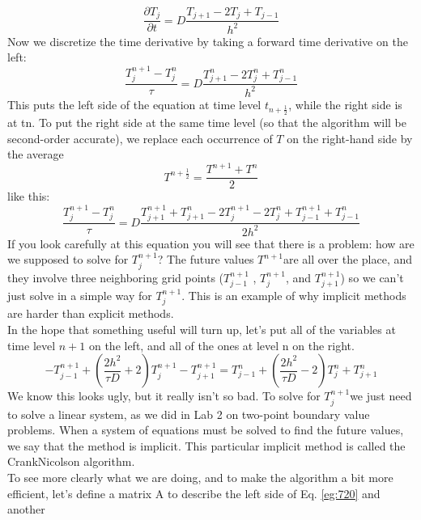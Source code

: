 \documentclass{book}
\theoremstyle{plain}
\theoremstyle{definition}
\numberwithin{exm}{chapter}
\theoremstyle{remark}
\theoremstyle{summary}
\theoremstyle{overview}
\begin{document}
\begin{equation}\label{eq:716}
\frac{\partial T_{j}}{\partial t}=D \frac{T_{j+1}-2 T_{j}+T_{j-1}}{h^{2}}
\end{equation}
Now we discretize the time derivative by taking a forward time derivative on the
left:
\begin{equation}\label{eq:717}
\frac{T_{j}^{n+1}-T_{j}^{n}}{\tau}=D \frac{T_{j+1}^{n}-2 T_{j}^{n}+T_{j-1}^{n}}{h^{2}}
\end{equation}
This puts the left side of the equation at time level $t_{n+\frac{1}{2}}$, while the right side is
at tn. To put the right side at the same time level (so that the algorithm will be
second-order accurate), we replace each occurrence of $T$ on the right-hand side
by the average
\begin{equation}\label{eq:718}
T^{n+\frac{1}{2}}=\frac{T^{n+1}+T^{n}}{2}
\end{equation}
like this:
\begin{equation}\label{eq:719}
\frac{T_{j}^{n+1}-T_{j}^{n}}{\tau}=D \frac{T_{j+1}^{n+1}+T_{j+1}^{n}-2 T_{j}^{n+1}-2 T_{j}^{n}+T_{j-1}^{n+1}+T_{j-1}^{n}}{2 h^{2}}
\end{equation}
If you look carefully at this equation you will see that there is a problem: how are
we supposed to solve for $T^{n+1}_j$? The future values $T^{n+1}$are all over the place, and
they involve three neighboring grid points ($T^{n+1}_{j-1}$ , $T^{n+1}_{j}$, and $T^{n+1}_{j+1}$) so we can’t just
solve in a simple way for $T^{n+1}_j$. This is an example of why implicit methods are
harder than explicit methods. \\ 
In the hope that something useful will turn up, let\rq s put all of the variables at
time level $n +1$ on the left, and all of the ones at level n on the right.
\begin{equation}\label{eq:720}
-T_{j-1}^{n+1}+\left(\frac{2 h^{2}}{\tau D}+2\right) T_{j}^{n+1}-T_{j+1}^{n+1}=T_{j-1}^{n}+\left(\frac{2 h^{2}}{\tau D}-2\right) T_{j}^{n}+T_{j+1}^{n}
\end{equation}
We know this looks ugly, but it really isn\rq t so bad. To solve for $T^{n+1}_j$we just need to
solve a linear system, as we did in Lab 2 on two-point boundary value problems.
When a system of equations must be solved to find the future values, we say
that the method is implicit. This particular implicit method is called the CrankNicolson algorithm. \\ 
To see more clearly what we are doing, and to make the algorithm a bit more
efficient, let\rq s define a matrix A to describe the left side of Eq. \eqref{eg:720} and another
\end{document}
